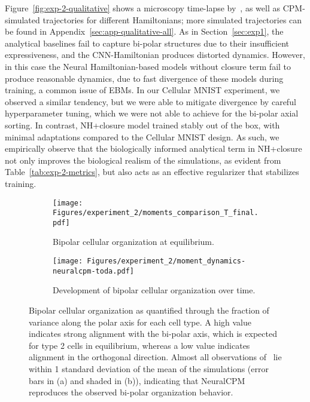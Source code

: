 Figure~\ref{fig:exp-2-qualitative} shows a microscopy time-lapse by~\citet{Toda2018Science}, as well as CPM-simulated trajectories for different Hamiltonians; more simulated trajectories can be found in Appendix~\ref{sec:app-qualitative-all}. As in Section~\ref{sec:exp1}, the analytical baselines fail to capture bi-polar structures due to their insufficient expressiveness, and the CNN-Hamiltonian produces distorted dynamics. However, in this case the Neural Hamiltonian-based models without closure term fail to produce reasonable dynamics, due to fast divergence of these models during training, a common issue of EBMs. In our Cellular MNIST experiment, we observed a similar tendency, but we were able to mitigate divergence by careful hyperparameter tuning, which we were not able to achieve for the bi-polar axial sorting. In contrast, NH+closure model trained stably out of the box, with minimal adaptations compared to the Cellular MNIST design. As such, we empirically observe that the biologically informed analytical term in NH+closure not only improves the biological realism of the simulations, as evident from Table~\ref{tab:exp-2-metrics}, but also acts as an effective regularizer that stabilizes training.

\begin{figure*}[h]
  \centering
  \begin{subfigure}[b]{0.485\textwidth}
    \texttt{[image: Figures/experiment\_2/moments\_comparison\_T\_final.pdf]}
    \caption{Bipolar cellular organization at equilibrium.}
    \label{fig:exp2-moment-final}
  \end{subfigure}
  \hfill
  \begin{subfigure}[b]{0.485\textwidth}
    \texttt{[image: Figures/experiment\_2/moment\_dynamics-neuralcpm-toda.pdf]}
    \caption{Development of bipolar cellular organization over time.}
    \label{fig:exp2-moment-dynamics}
  \end{subfigure}
  \caption{Bipolar cellular organization as quantified through the fraction of variance along the polar axis for each cell type. A high value indicates strong alignment with the bi-polar axis, which is expected for type 2 cells in equilibrium, whereas a low value indicates alignment in the orthogonal direction. Almost all observations of~\citet{Toda2018Science} lie within 1 standard deviation of the mean of the simulations (error bars in (a) and shaded in (b)), indicating that NeuralCPM reproduces the observed bi-polar organization behavior.}
  \label{fig:exp-2-moments-all-results}
\end{figure*}


